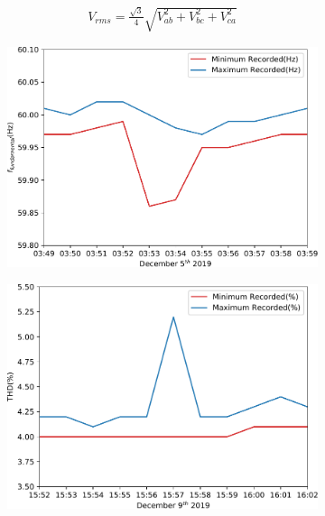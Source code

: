 \begin{equation}\label{eq:v_rms_3phaseN_to_signle}
\begin{aligned}
    V_{rms} = \frac{\sqrt{3}}{4}\sqrt{V_{ab}^2 + V_{bc}^2 +V_{ca}^2}
\end{aligned}
\end{equation}

\begin{figure}[h]
    \centering
    \begin{subfigure}{.45\textwidth}
        \centering
        \includegraphics[width=1\linewidth]{img/napali_eval/gt/gt_f_example.pdf}
        \caption{}
        \label{expdes:fig:gt_example:f}
    \end{subfigure}\hspace{5mm}
    \begin{subfigure}{.45\textwidth}
        \centering
        \includegraphics[width=1\linewidth]{img/napali_eval/gt/gt_thd_example.pdf}

\end{subfigure}
\end{figure}
